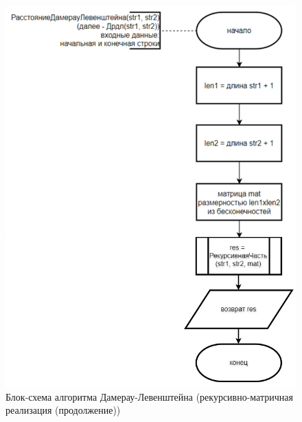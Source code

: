 \begin{figure}[H]
    \centering
    \includegraphics[width=1\textwidth]{img/block_2_3_2.png}
    \caption{Блок-схема алгоритма Дамерау-Левенштейна (рекурсивно-матричная\\ реализация (продолжение))}
    \label{fig:block_2_3_2}
\end{figure}
\newpage